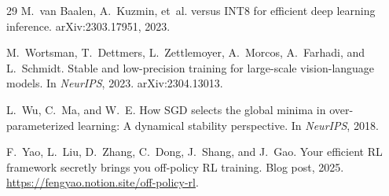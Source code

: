 \documentclass[11pt,letterpaper]{article}
\begin{document}
{\begin{thebibliography}{29}
M.~van Baalen, A.~Kuzmin, et~al.
 versus {INT8} for efficient deep learning inference.
\newblock arXiv:2303.17951, 2023.

M.~Wortsman, T.~Dettmers, L.~Zettlemoyer, A.~Morcos, A.~Farhadi, and L.~Schmidt.
\newblock Stable and low-precision training for large-scale vision-language models.
\newblock In \emph{NeurIPS}, 2023. arXiv:2304.13013.

L.~Wu, C.~Ma, and W.~E.
\newblock How {SGD} selects the global minima in over-parameterized learning: A dynamical stability perspective.
\newblock In \emph{NeurIPS}, 2018.

F.~Yao, L.~Liu, D.~Zhang, C.~Dong, J.~Shang, and J.~Gao.
\newblock Your efficient {RL} framework secretly brings you off-policy {RL} training.
\newblock Blog post, 2025. \url{https://fengyao.notion.site/off-policy-rl}.

\end{thebibliography}}
\end{document}
